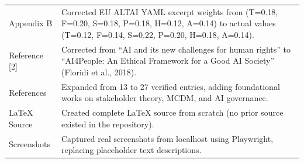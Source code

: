 \begin{table}[H]
\begin{tabularx}{\textwidth}{@{}lX@{}}
\addlinespace
Appendix B & Corrected EU ALTAI YAML excerpt weights from (T=0.18, F=0.20, S=0.18, P=0.18, H=0.12, A=0.14) to actual values (T=0.12, F=0.14, S=0.22, P=0.20, H=0.18, A=0.14). \\
\addlinespace
Reference [2] & Corrected from \enquote{AI and its new challenges for human rights} to \enquote{AI4People: An Ethical Framework for a Good AI Society} (Floridi et al., 2018). \\
\addlinespace
References & Expanded from 13 to 27 verified entries, adding foundational works on stakeholder theory, MCDM, and AI governance. \\
\addlinespace
LaTeX Source & Created complete LaTeX source from scratch (no prior source existed in the repository). \\
\addlinespace
Screenshots & Captured real screenshots from localhost using Playwright, replacing placeholder text descriptions. \\
\bottomrule
\end{tabularx}
\end{table}
